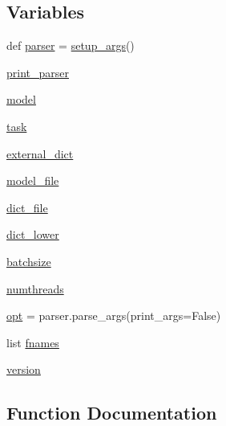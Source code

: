 \subsection*{Variables}
\begin{DoxyCompactItemize}
\item 
def \hyperlink{namespaceeval__wordstat_a46e86ff5435363475d0171c9bde00fc8}{parser} = \hyperlink{namespaceeval__wordstat_a3872be823cf90eb2beb19e7aeb94a898}{setup\+\_\+args}()
\item 
\hyperlink{namespaceeval__wordstat_a1eeded546d4fba5edcd7531fe75b95eb}{print\+\_\+parser}
\item 
\hyperlink{namespaceeval__wordstat_aae7b83a7fa256a49dcc6978b83f55ded}{model}
\item 
\hyperlink{namespaceeval__wordstat_a151bdc0806a8f6bc026424f2dbb1555e}{task}
\item 
\hyperlink{namespaceeval__wordstat_a0187c7471425ec9b859405c1e1fa5b6f}{external\+\_\+dict}
\item 
\hyperlink{namespaceeval__wordstat_af9acf373a29cffbdc88bf271775d49c3}{model\+\_\+file}
\item 
\hyperlink{namespaceeval__wordstat_a4410f5b30aee351d3d4d38491779d637}{dict\+\_\+file}
\item 
\hyperlink{namespaceeval__wordstat_a2e55b1d954bcca3f7c68733dedbe20e0}{dict\+\_\+lower}
\item 
\hyperlink{namespaceeval__wordstat_a1857aba571e92b0bd99ba8bee5194921}{batchsize}
\item 
\hyperlink{namespaceeval__wordstat_ad91a8093b019c0b0088d47b27816373d}{numthreads}
\item 
\hyperlink{namespaceeval__wordstat_a47d20263ebe9cfadbc2d479ba8ac1e25}{opt} = parser.\+parse\+\_\+args(print\+\_\+args=False)
\item 
list \hyperlink{namespaceeval__wordstat_a9b6a657068e17305f2ecfaabb2e1f4e1}{fnames}
\item 
\hyperlink{namespaceeval__wordstat_af74ced6a7df00b343701ec4ee7279996}{version}
\end{DoxyCompactItemize}


\subsection{Function Documentation}
\mbox{\label{namespaceeval__wordstat_aeb6ae646e7e2bede292baff78ca1bd83}} 
